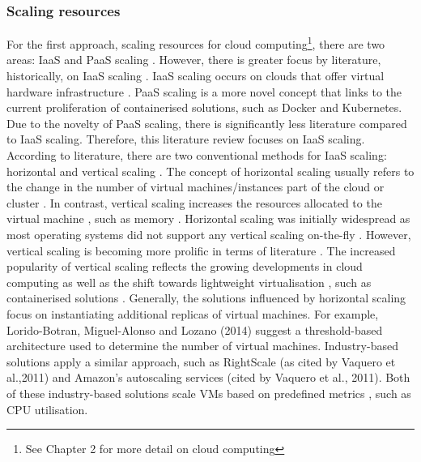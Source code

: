 \subsubsection{Scaling resources}
For the first approach, scaling resources for cloud computing\footnote{See Chapter 2 for more detail on cloud computing},
there are two areas: IaaS and PaaS scaling \cite{vaquero2011dynamically}.  However, there is greater focus by literature,
historically, on IaaS scaling \cite{youseff2008toward}. IaaS
scaling occurs on clouds that offer virtual hardware infrastructure \cite{vaquero2011dynamically, youseff2008toward}.
PaaS scaling is a more novel concept that links to the
current proliferation of containerised solutions, such as Docker and Kubernetes. Due to the novelty of PaaS scaling, there is significantly
less literature compared to IaaS scaling. Therefore, this literature
review focuses on IaaS scaling. 
\newline\newline
According to literature, there
are two conventional methods for IaaS scaling: horizontal and vertical
scaling \cite{sotiriadis2016vertical}. The concept of horizontal scaling usually refers to the change in the
number of virtual machines/instances part of the cloud or cluster \cite{naskos2015dependable}. In contrast, vertical scaling increases the resources
allocated to the virtual machine , such as memory \cite{coutinho2015elasticity}. Horizontal scaling was initially
widespread as most operating systems did not support any vertical
scaling on-the-fly \cite{vaquero2011dynamically,nandgaonkar2014comprehensive}. However, vertical scaling is becoming more prolific in
terms of literature \cite{coutinho2015elasticity}. The increased popularity of
vertical scaling reflects the growing developments in cloud computing as
well as the shift towards lightweight virtualisation , such as
containerised solutions \cite{morabito2018consolidate}.
\newline\newline
Generally, the solutions influenced by horizontal scaling focus on
instantiating additional replicas of virtual machines. For example,
Lorido-Botran, Miguel-Alonso and Lozano (2014) suggest a threshold-based
architecture used to determine the number of virtual machines.
Industry-based solutions apply a similar approach, such as RightScale
(as cited by Vaquero et al.,2011) and Amazon's
autoscaling services (cited by Vaquero et al., 2011).
Both of these industry-based solutions scale VMs based on predefined
metrics , such as CPU utilisation.
\newline\newline
